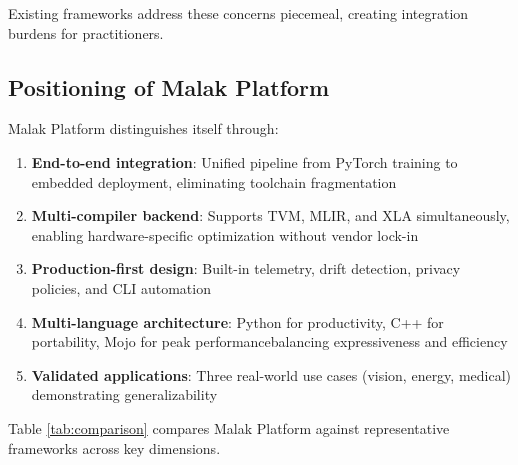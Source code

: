 Existing frameworks address these concerns piecemeal, creating integration burdens for practitioners.

\subsection{Positioning of Malak Platform}

Malak Platform distinguishes itself through:
\begin{enumerate}
\item \textbf{End-to-end integration}: Unified pipeline from PyTorch training to embedded deployment, eliminating toolchain fragmentation
\item \textbf{Multi-compiler backend}: Supports TVM, MLIR, and XLA simultaneously, enabling hardware-specific optimization without vendor lock-in
\item \textbf{Production-first design}: Built-in telemetry, drift detection, privacy policies, and CLI automation
\item \textbf{Multi-language architecture}: Python for productivity, C++ for portability, Mojo for peak performancebalancing expressiveness and efficiency
\item \textbf{Validated applications}: Three real-world use cases (vision, energy, medical) demonstrating generalizability
\end{enumerate}

Table \ref{tab:comparison} compares Malak Platform against representative frameworks across key dimensions.

\begin{table}[t]
\centering
\caption{Comparison of Edge AI Frameworks}
\label{tab:comparison}
\end{table}
